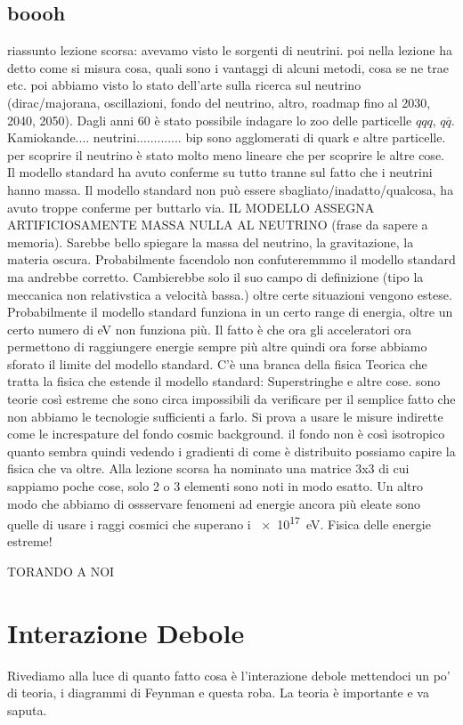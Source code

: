 \section{boooh}
    riassunto lezione scorsa: avevamo visto le sorgenti di neutrini. poi nella lezione ha detto come si misura cosa, quali sono i vantaggi di alcuni metodi, cosa se ne trae etc. poi abbiamo visto lo stato dell'arte sulla ricerca sul neutrino (dirac/majorana, oscillazioni, fondo del neutrino, altro, roadmap fino al 2030, 2040, 2050). Dagli anni 60 è stato possibile indagare lo zoo delle particelle $qqq$, $q\overline{q}$. Kamiokande.... neutrini............. bip sono agglomerati di quark e altre particelle. per scoprire il neutrino è stato molto meno lineare che per scoprire le altre cose. Il modello standard ha avuto conferme su tutto tranne sul fatto che i neutrini hanno massa. Il modello standard non può essere sbagliato/inadatto/qualcosa, ha avuto troppe conferme per buttarlo via. IL MODELLO ASSEGNA ARTIFICIOSAMENTE MASSA NULLA AL NEUTRINO (frase da sapere a memoria). Sarebbe bello spiegare la massa del neutrino, la gravitazione, la materia oscura. Probabilmente facendolo non confuteremmmo il modello standard ma andrebbe corretto. Cambierebbe solo il suo campo di definizione (tipo la meccanica non relativstica a velocità bassa.) oltre certe situazioni vengono estese. Probabilmente il modello standard funziona in un certo range di energia, oltre un certo numero di \unit{\eV} non funziona più. Il fatto è che ora gli acceleratori ora permettono di raggiungere energie sempre più altre quindi ora forse abbiamo sforato il limite del modello standard. C'è una branca della fisica Teorica che tratta la fisica che estende il modello standard: Superstringhe e altre cose. sono teorie così estreme che sono circa impossibili da verificare per il semplice fatto che non abbiamo le tecnologie sufficienti a farlo. Si prova a usare le misure indirette come le increspature del fondo cosmic background. il fondo non è così isotropico quanto sembra quindi vedendo i gradienti di come è distribuito possiamo capire la fisica che va oltre. Alla lezione scorsa ha nominato una matrice 3x3 di cui sappiamo poche cose, solo 2 o 3 elementi sono noti in modo esatto. Un altro modo che abbiamo di ossservare fenomeni ad energie ancora più eleate sono quelle di usare i raggi cosmici che superano i \SI{e+17}{\eV}. Fisica delle energie estreme!

TORANDO A NOI

\chapter{Interazione Debole}
    Rivediamo alla luce di quanto fatto cosa è l'interazione debole mettendoci un po' di teoria, i diagrammi di Feynman e questa roba. La teoria è importante e va saputa.

